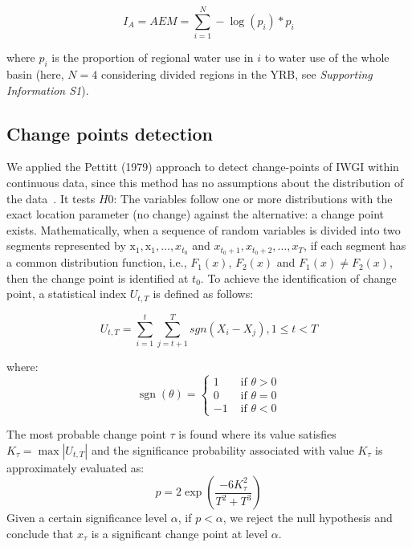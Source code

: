 \documentclass[draft]{../agujournal2019}
\begin{document}
	\begin{equation}
		I_A = AEM = \sum_{i=1}^N - \log(p_{i}) * p_{i}
	\end{equation}

	where $p_{i}$ is the proportion of regional water use in $i$ to water use of the whole basin (here, $N=4$ considering divided regions in the YRB, see \textit{Supporting Information S1}).

	\subsection{Change points detection}
		We applied the Pettitt (1979) approach to detect change-points of IWGI within continuous data, since this method has no assumptions about the distribution of the data~\cite{pettitt1979}.
		It tests $H0$: The variables follow one or more distributions with the exact location parameter (no change) against the alternative: a change point exists.
		Mathematically, when a sequence of random variables is divided into two segments represented by $\mathrm{x}_{1}, \mathrm{x}_{1}, \ldots, x_{t_{0}}$ and $x_{t_{0}+1}, x_{t_{0}+2}, \ldots, x_{T}$, if each segment has a common distribution function, i.e., $F_1(x)$, $F_2(x)$ and $F_1(x) \neq F_2(x)$, then the change point is identified at $t_0$. To achieve the identification of change point, a statistical index $U_{t,T}$ is defined as follows:

		\begin{equation}
			U_{t, T} = \sum_{i=1}^t\sum_{j=t+1}^T sgn(X_i - X_j), 1 \leq t < T
		\end{equation}

		where:
		\begin{equation}
			\operatorname{sgn}(\theta)= \begin{cases}1 & \text { if } \theta>0 \\ 0 & \text { if } \theta=0 \\ -1 & \text { if } \theta<0\end{cases}
		\end{equation}

		The most probable change point $\tau$ is found where its value satisfies $K_{\tau} = \max|U_{t, T}|$ and the significance probability associated with value $K_{\tau}$ is approximately evaluated as:
		\begin{equation}
			p=2 \exp \left(\frac{-6 K_{\tau}^{2}}{T^{2}+T^{3}}\right)
		\end{equation}
		Given a certain significance level $\alpha$, if $p < \alpha$, we reject the null hypothesis and conclude that $x_{\tau}$ is a significant change point at level $\alpha$.
\end{document}
